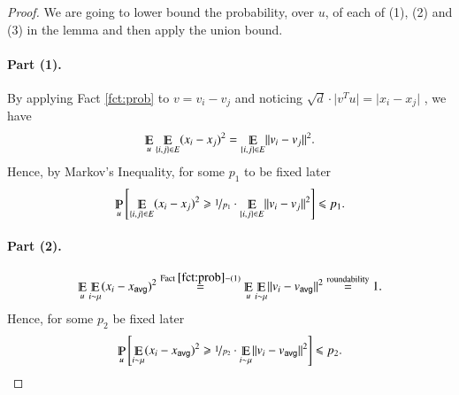 \documentclass[twoside,leqno,twocolumn]{article}
\newcommand{\nfrac}{\nicefrac}
\renewcommand{\mathbb}{\varmathbb}
\renewcommand{\leq}{\leqslant}
\renewcommand{\geq}{\geqslant}
\newcommand{\abs}[1]{\lvert#1\rvert}
\newcommand{\norm}[1]{\lVert#1\rVert}
\newcommand{\Esymb}{\mathbb{E}}
\newcommand{\Psymb}{\mathbb{P}}
\DeclareMathOperator*{\E}{\Esymb}
\DeclareMathOperator*{\ProbOp}{\Psymb}
\renewcommand{\Pr}{\ProbOp}
\numberwithin{equation}{section}
\newcommand{\avg}{{\ensuremath{\mathsf{avg}}\xspace}}
\begin{document}
\begin{proof}
We are going to lower bound the probability, over $u$,  of each of (1), (2) and (3) in the lemma and then apply the union bound. 

\paragraph{Part (1).} 
By applying Fact \ref{fct:prob} to $v = v_i - v_j$ and noticing $\sqrt{d} \cdot \abs{v^T u} = \abs{x_i - x_j}$ , we have
$$ \E_u \E_{\{i,j\} \in E} (x_i - x_j)^2 = \E_{\{i,j\} \in E} \norm{v_i - v_j}^2.$$
Hence, by Markov's Inequality, for some $p_1$ to be fixed later
$$ \Pr_u\left[\E_{\{i,j\} \in E} (x_i - x_j)^2 \geq \nfrac{1}{p_1} \cdot \E_{\{i,j\} \in E} \norm{v_i - v_j}^2\right] \leq p_1. $$

\paragraph{Part (2).}
$$ \E_{u} \E_{i \sim \mu} (x_i - x_\avg)^2 \stackrel{{\rm Fact \; \ref{fct:prob}-(1)}}{=}  \E_{u} \E_{i \sim \mu} \norm{v_i - v_\avg}^2 \stackrel{{\rm roundability}}{=} 1.$$ Hence, for some $p_2$ be fixed later 
$$  \Pr_u\left[ \E_{i \sim \mu} (x_i - x_\avg)^2 \geq \nfrac{1}{p_2} \cdot  \E_{i \sim \mu} \norm{v_i - v_\avg}^2 \right] \leq p_2.$$
 

\end{proof}
\end{document}
